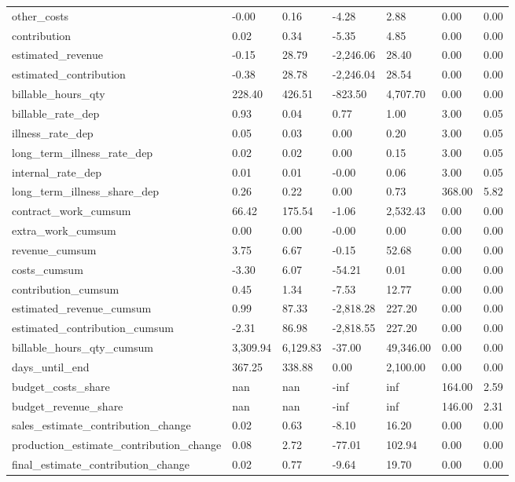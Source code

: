 \begin{landscape}
\begin{longtable}[h!]{lllllll}
other_costs & -0.00 & 0.16 & -4.28 & 2.88 & 0.00 & 0.00 \\
contribution & 0.02 & 0.34 & -5.35 & 4.85 & 0.00 & 0.00 \\
estimated_revenue & -0.15 & 28.79 & -2,246.06 & 28.40 & 0.00 & 0.00 \\
estimated_contribution & -0.38 & 28.78 & -2,246.04 & 28.54 & 0.00 & 0.00 \\
billable_hours_qty & 228.40 & 426.51 & -823.50 & 4,707.70 & 0.00 & 0.00 \\
billable_rate_dep & 0.93 & 0.04 & 0.77 & 1.00 & 3.00 & 0.05 \\
illness_rate_dep & 0.05 & 0.03 & 0.00 & 0.20 & 3.00 & 0.05 \\
long_term_illness_rate_dep & 0.02 & 0.02 & 0.00 & 0.15 & 3.00 & 0.05 \\
internal_rate_dep & 0.01 & 0.01 & -0.00 & 0.06 & 3.00 & 0.05 \\
long_term_illness_share_dep & 0.26 & 0.22 & 0.00 & 0.73 & 368.00 & 5.82 \\
contract_work_cumsum & 66.42 & 175.54 & -1.06 & 2,532.43 & 0.00 & 0.00 \\
extra_work_cumsum & 0.00 & 0.00 & -0.00 & 0.00 & 0.00 & 0.00 \\
revenue_cumsum & 3.75 & 6.67 & -0.15 & 52.68 & 0.00 & 0.00 \\
costs_cumsum & -3.30 & 6.07 & -54.21 & 0.01 & 0.00 & 0.00 \\
contribution_cumsum & 0.45 & 1.34 & -7.53 & 12.77 & 0.00 & 0.00 \\
estimated_revenue_cumsum & 0.99 & 87.33 & -2,818.28 & 227.20 & 0.00 & 0.00 \\
estimated_contribution_cumsum & -2.31 & 86.98 & -2,818.55 & 227.20 & 0.00 & 0.00 \\
billable_hours_qty_cumsum & 3,309.94 & 6,129.83 & -37.00 & 49,346.00 & 0.00 & 0.00 \\
days_until_end & 367.25 & 338.88 & 0.00 & 2,100.00 & 0.00 & 0.00 \\
budget_costs_share & nan & nan & -inf & inf & 164.00 & 2.59 \\
budget_revenue_share & nan & nan & -inf & inf & 146.00 & 2.31 \\
sales_estimate_contribution_change & 0.02 & 0.63 & -8.10 & 16.20 & 0.00 & 0.00 \\
production_estimate_contribution_change & 0.08 & 2.72 & -77.01 & 102.94 & 0.00 & 0.00 \\
final_estimate_contribution_change & 0.02 & 0.77 & -9.64 & 19.70 & 0.00 & 0.00 \\

\end{longtable}
\end{landscape}

